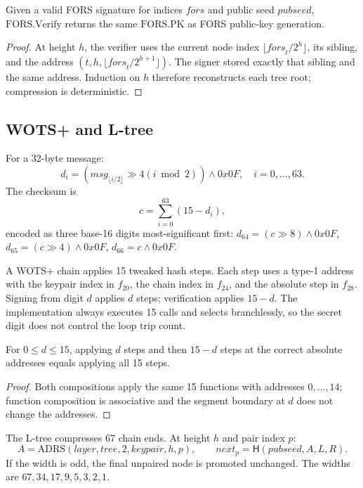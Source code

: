 \documentclass[runningheads]{llncs}
\newcommand{\Hash}{\mathsf{H}}
\begin{document}
\begin{lemma}
Given a valid FORS signature for indices $\mathit{fors}$ and public
seed $\mathit{pubseed}$, $\mathrm{FORS.Verify}$ returns the same
$\mathrm{FORS.PK}$ as FORS public-key generation.
\end{lemma}

\begin{proof}
At height $h$, the verifier uses the current node index
$\lfloor\mathit{fors}_t/2^h\rfloor$, its sibling, and the address
$(t,h,\lfloor\mathit{fors}_t/2^{h+1}\rfloor)$.  The signer stored
exactly that sibling and the same address.  Induction on $h$ therefore
reconstructs each tree root; compression is deterministic.
\end{proof}

\subsection{WOTS+ and L-tree}

\begin{definition}
For a 32-byte message:
\[
 d_i=(msg_{\lfloor i/2\rfloor}\gg4(i\bmod2))\land0x0F,
 \quad i=0,\ldots,63.
\]
The checksum is
\[
 c=\sum_{i=0}^{63}(15-d_i),
\]
encoded as three base-16 digits most-significant first:
$d_{64}=(c\gg8)\land0x0F$,
$d_{65}=(c\gg4)\land0x0F$,
$d_{66}=c\land0x0F$.
\end{definition}

A WOTS+ chain applies 15 tweaked hash steps.  Each step uses a
type-1 address with the keypair index in $f_{20}$, the chain index in
$f_{24}$, and the absolute step in $f_{28}$.  Signing from digit $d$
applies $d$ steps; verification applies $15-d$.  The implementation
always executes 15 calls and selects branchlessly, so the secret digit
does not control the loop trip count.

\begin{lemma}
For $0\le d\le15$, applying $d$ steps and then $15-d$ steps at the
correct absolute addresses equals applying all 15 steps.
\end{lemma}

\begin{proof}
Both compositions apply the same 15 functions with addresses
$0,\ldots,14$; function composition is associative and the segment
boundary at $d$ does not change the addresses.
\end{proof}

The L-tree compresses 67 chain ends.  At height $h$ and pair index $p$:
\[
 A=\mathrm{ADRS}(\mathit{layer},\mathit{tree},2,
 \mathit{keypair},h,p),\qquad
 \mathit{next}_p=\Hash(\mathit{pubseed},A,L,R).
\]
If the width is odd, the final unpaired node is promoted unchanged.  The
widths are $67,34,17,9,5,3,2,1$.
\end{document}
